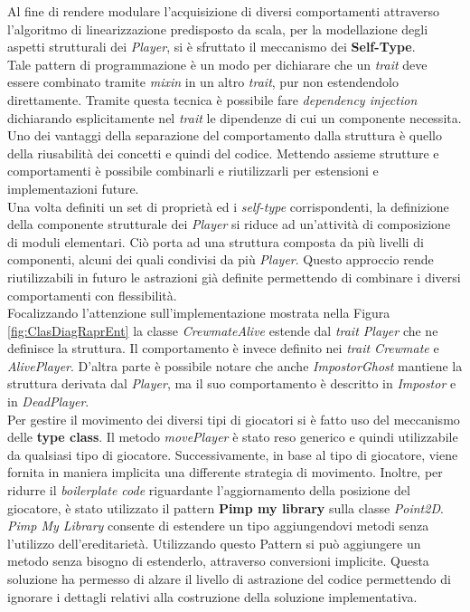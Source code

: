 Al fine di rendere modulare l'acquisizione di diversi comportamenti attraverso l'algoritmo di linearizzazione predisposto da scala, per la modellazione degli aspetti strutturali dei \textit{Player}, si \`e sfruttato il meccanismo dei \textbf{Self-Type}.\\
Tale pattern di programmazione \`e un modo per dichiarare che un \textit{trait} deve essere combinato tramite \textit{mixin} in un altro \textit{trait}, pur non estendendolo direttamente. Tramite questa tecnica è possibile fare \textit{dependency injection} dichiarando esplicitamente nel \textit{trait} le dipendenze di cui un componente necessita. Uno dei vantaggi della separazione del comportamento dalla struttura \`e quello della riusabilit\`a dei concetti e quindi del codice. Mettendo assieme strutture e comportamenti \`e possibile combinarli e riutilizzarli per estensioni e implementazioni future.\\
Una volta definiti un set di propriet\`a ed i \textit{self-type} corrispondenti, la definizione della componente strutturale dei \textit{Player} si riduce ad un'attivit\`a di composizione di moduli elementari. Ci\`o porta ad una struttura composta da pi\`u livelli di componenti, alcuni dei quali condivisi da pi\`u \textit{Player}. Questo approccio rende riutilizzabili in futuro le astrazioni gi\`a definite permettendo di combinare i diversi comportamenti con flessibilit\`a.\\
Focalizzando l'attenzione sull'implementazione mostrata nella Figura \ref{fig:ClasDiagRaprEnt} la classe \textit{CrewmateAlive} estende dal \textit{trait Player} che ne definisce la struttura. Il comportamento \`e invece definito nei \textit{trait Crewmate} e \textit{AlivePlayer}. D'altra parte \`e possibile notare che anche \textit{ImpostorGhost} mantiene la struttura derivata dal \textit{Player}, ma il suo comportamento è descritto in \textit{Impostor} e in \textit{DeadPlayer}.\\
Per gestire il movimento dei diversi tipi di giocatori si \`e fatto uso del meccanismo delle \textbf{type class}. Il metodo \textit{movePlayer} \`e stato reso generico e quindi utilizzabile da qualsiasi tipo di giocatore. Successivamente, in base al tipo di giocatore, viene fornita in maniera implicita una differente strategia di movimento. Inoltre, per ridurre il \textit{boilerplate code} riguardante l'aggiornamento della posizione del giocatore, \`e stato utilizzato il pattern \textbf{Pimp my library} sulla classe \textit{Point2D}.\\
\textit{Pimp My Library} consente di estendere un tipo aggiungendovi metodi senza l'utilizzo dell'ereditariet\`a. Utilizzando questo Pattern si pu\`o aggiungere un metodo senza bisogno di estenderlo, attraverso conversioni implicite. Questa soluzione ha permesso di alzare il livello di astrazione del codice permettendo di ignorare i dettagli relativi alla costruzione della soluzione implementativa.

